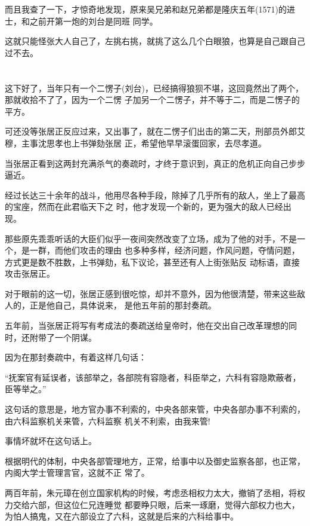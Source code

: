\documentclass[11pt,a4paper,onecolumn]{article}
\begin{document}
而且我查了一下，才惊奇地发现，原来吴兄弟和赵兄弟都是隆庆五年(1571)的进士，和之前开第一炮的刘台是同班
同学。

这就只能怪张大人自己了，左挑右挑，就挑了这么几个白眼狼，也算是自己跟自己过不去。

\section[\thesection]{}

这下好了，当年只有一个二愣子(刘台)，已经搞得狼狈不堪，这回竟然出了两个，那就收拾不了了，因为一个二愣
子加另一个二愣子，并不等于二，而是二愣子的平方。

可还没等张居正反应过来，又出事了，就在二愣子们出击的第二天，刑部员外郎艾穆，主事沈思孝也上书弹劾张居
正，希望他早早滚蛋回家，去尽孝道。

当张居正看到这两封充满杀气的奏疏时，才终于意识到，真正的危机正向自己步步逼近。

经过长达三十余年的战斗，他用尽各种手段，除掉了几乎所有的敌人，坐上了最高的宝座，然而在此君临天下之
时，他才发现一个新的，更为强大的敌人已经出现。

那些原先乖乖听话的大臣们似乎一夜间突然改变了立场，成为了他的对手，不是一个，是一群，而他们攻击的理由
也多种多样，经济问题，作风问题，夺情问题，方式更是数不胜数，上书弹劾，私下议论，甚至还有人上街张贴反
动标语，直接攻击张居正。

对于眼前的这一切，张居正感到很吃惊，却并不意外，因为他很清楚，带来这些敌人的，正是他自己，具体说来，
是他五年前的那封奏疏。

五年前，当张居正将写有考成法的奏疏送给皇帝时，他在交出自己改革理想的同时，还附带了一个阴谋。

因为在那封奏疏中，有着这样几句话：

``抚案官有延误者，该部举之，各部院有容隐者，科臣举之，六科有容隐欺蔽者，臣等举之。''

这句话的意思是，地方官办事不利索的，中央各部来管，中央各部办事不利索的，由六科监察机关来管，六科监察
机关不利索，由我来管!

事情坏就坏在这句话上。

根据明代的体制，中央各部管理地方，正常，给事中以及御史监察各部，也正常，内阁大学士管理言官，这就不正
常了。

两百年前，朱元璋在创立国家机构的时候，考虑丞相权力太大，撤销了丞相，将权力交给六部，但这位仁兄连睡觉
都要睁只眼，后来一琢磨，觉得六部权力也大，为怕人搞鬼，又在六部设立了六科，这就是后来的六科给事中。

\section[\thesection]{}
\end{document}
